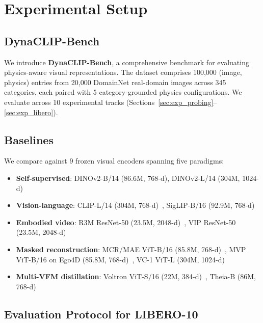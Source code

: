 \documentclass{article}
\begin{document}
\section{Experimental Setup}
\label{sec:setup}

\subsection{DynaCLIP-Bench}

We introduce \textbf{DynaCLIP-Bench}, a comprehensive benchmark for evaluating physics-aware visual representations. The dataset comprises 100,000 (image, physics) entries from 20,000 DomainNet real-domain images across 345 categories, each paired with 5 category-grounded physics configurations. We evaluate across 10 experimental tracks (Sections~\ref{sec:exp_probing}--\ref{sec:exp_libero}).

\subsection{Baselines}
\label{sec:baselines}

We compare against 9 frozen visual encoders spanning five paradigms:

\begin{itemize}[leftmargin=*,itemsep=1pt,topsep=2pt]
    \item \textbf{Self-supervised}: DINOv2-B/14 (86.6M, 768-d), DINOv2-L/14 (304M, 1024-d)~\cite{oquab2024dinov2}
    \item \textbf{Vision-language}: CLIP-L/14 (304M, 768-d)~\cite{radford2021clip}, SigLIP-B/16 (92.9M, 768-d)~\cite{zhai2023siglip}
    \item \textbf{Embodied video}: R3M ResNet-50 (23.5M, 2048-d)~\cite{nair2022r3m}, VIP ResNet-50 (23.5M, 2048-d)~\cite{ma2022vip}
    \item \textbf{Masked reconstruction}: MCR/MAE ViT-B/16 (85.8M, 768-d)~\cite{he2022mae}, MVP ViT-B/16 on Ego4D (85.8M, 768-d)~\cite{xiao2022mvp}, VC-1 ViT-L (304M, 1024-d)~\cite{radosavovic2023vc1}
    \item \textbf{Multi-VFM distillation}: Voltron ViT-S/16 (22M, 384-d)~\cite{karamcheti2023voltron}, Theia-B (86M, 768-d)~\cite{shang2024theia}
\end{itemize}

\subsection{Evaluation Protocol for LIBERO-10}
\label{sec:libero_protocol}
\end{document}
